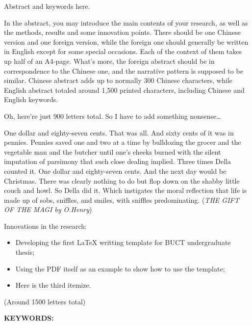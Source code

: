 \begin{abstracten}
	Abstract and keywords here.
	
	In the abstract, you may introduce the main contents of your research, as well as the methods, results and some innovation points. There should be one Chinese version and one foreign version, while the foreign one should generally be written in English except for some special occasions. Each of the context of them takes up half of an A4-page. What's more, the foreign abstract should be in correspondence to the Chinese one, and the narrative pattern is supposed to be similar. Chinese abstract adds up to normally 300 Chinese characters, while English abstract totaled around 1,500 printed characters, including Chinese and English keywords.

	Oh, here're just 900 letters total. So I have to add something nonsense\dots 

	One dollar and eighty-seven cents. That was all. And sixty cents of it was in pennies. Pennies saved one and two at a time by bulldozing the grocer and the vegetable man and the butcher until one's cheeks burned with the silent imputation of parsimony that such close dealing implied. Three times Della counted it. One dollar and eighty-seven cents. And the next day would be Christmas. There was clearly nothing to do but flop down on the shabby little couch and howl. So Della did it. Which instigates the moral reflection that life is made up of sobs, sniffles, and smiles, with sniffles predominating. (\textit{THE GIFT OF THE MAGI by O.Henry})
	
	Innovations in the research:
	\begin{itemize}
		\item Developing the first \LaTeX{} writting template for BUCT undergraduate thesis;
		\item Using the PDF itself as an example to show how to use the template;
		\item Here is the third itemize.
	\end{itemize}

	(Around \si{1500} letters total)
	\vspace{1em}

	\textbf{{KEYWORDS:}\quad {\LaTeX}}
\end{abstracten}